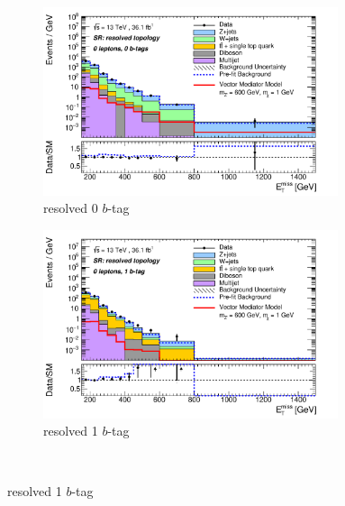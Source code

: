 \begin{figure}[htbp]
  \begin{subfigure}{0.49\textwidth}
    \centering
    \includegraphics[width=0.95\textwidth]{figures/monoV/postfit/monoV_0lep_0tag_resolved_massPass_met_XS.pdf}
    \caption{resolved 0 \(b\)-tag}
  \end{subfigure}
  \begin{subfigure}{0.49\textwidth}
    \centering
    \includegraphics[width=0.95\textwidth]{figures/monoV/postfit/monoV_0lep_1tag_resolved_massPass_met_XS.pdf}
    \caption{resolved 1 \(b\)-tag}
  \end{subfigure} \\


\end{figure}
